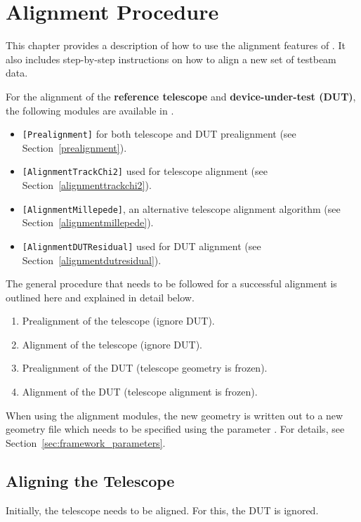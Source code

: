 \chapter{Alignment Procedure}
\label{ch:howtoalign}

This chapter provides a description of how to use the alignment features of \corry. 
It also includes step-by-step instructions on how to align a new set of testbeam data.

For the alignment of the \textbf{reference telescope} and \textbf{device-under-test (DUT)}, the following modules are available in \corry.
\begin{itemize}
\item \texttt{[Prealignment]} for both telescope and DUT prealignment (see Section~\ref{prealignment}).
\item \texttt{[AlignmentTrackChi2]} used for telescope alignment (see Section~\ref{alignmenttrackchi2}).
\item \texttt{[AlignmentMillepede]}, an alternative telescope alignment algorithm (see Section~\ref{alignmentmillepede}).
\item \texttt{[AlignmentDUTResidual]} used for DUT alignment (see Section~\ref{alignmentdutresidual}).
\end{itemize}

The general procedure that needs to be followed for a successful alignment is outlined here and explained in detail below.
\begin{enumerate}
\item Prealignment of the telescope (ignore DUT).
\item Alignment of the telescope (ignore DUT).
\item Prealignment of the DUT (telescope geometry is frozen).
\item Alignment of the DUT (telescope alignment is frozen).
\end{enumerate}

\begin{warning}
When using the alignment modules, the new geometry is written out to a new geometry file which needs to be specified using the parameter .
For details, see Section~\ref{sec:framework_parameters}.
\end{warning}

\section{Aligning the Telescope}
\label{sec:align_tel}
Initially, the telescope needs to be aligned. 
For this, the DUT is ignored.


